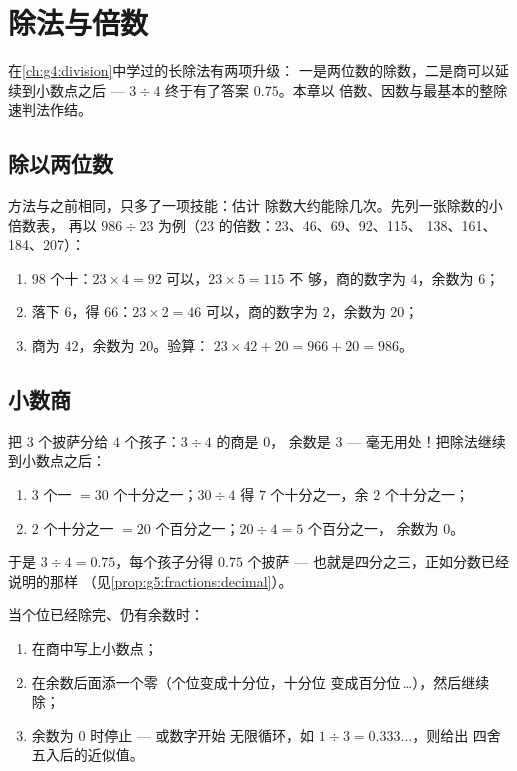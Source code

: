 \chapter{除法与倍数}\label{ch:g5:division}

在\cref{ch:g4:division}中学过的长除法有两项升级：
一是两位数的除数，二是商可以延续到小数点之后 ---
$3 \div 4$ 终于有了答案 $0.75$。本章以
倍数、因数与最基本的整除速判法作结。

\section{除以两位数}

\begin{method}[两位数除数]\label{met:g5:division:twodigits}
方法与之前相同，只多了一项技能：估计
除数大约能除几次。先列一张除数的小倍数表，
再以 $986 \div 23$ 为例（23 的倍数：23、46、69、92、115、
138、161、184、207）：
\begin{enumerate}
  \item $98$ 个十：$23 \times 4 = 92$ 可以，$23 \times 5 = 115$ 不
        够，商的数字为 $4$，余数为 $6$；
  \item 落下 $6$，得 $66$：$23 \times 2 = 46$ 可以，商的数字为
        $2$，余数为 $20$；
  \item 商为 $42$，余数为 $20$。验算：
        $23 \times 42 + 20 = 966 + 20 = 986$。
\end{enumerate}
\end{method}

\section{小数商}

\begin{example}[不肯停在余数处的除法]\label{ex:g5:division:decimal}
把 $3$ 个披萨分给 $4$ 个孩子：$3 \div 4$ 的商是 $0$，
余数是 $3$ --- 毫无用处！把除法继续到小数点之后：
\begin{enumerate}
  \item $3$ 个一 $= 30$ 个十分之一；$30 \div 4$ 得 $7$ 个十分之一，余
        $2$ 个十分之一；
  \item $2$ 个十分之一 $= 20$ 个百分之一；$20 \div 4 = 5$ 个百分之一，
        余数为 $0$。
\end{enumerate}
于是 $3 \div 4 = 0.75$，每个孩子分得 $0.75$ 个披萨 ---
也就是四分之三，正如分数已经说明的那样
（见\cref{prop:g5:fractions:decimal}）。
\end{example}

\begin{method}[把除法延续到小数点之后]\label{met:g5:division:continue}
当个位已经除完、仍有余数时：
\begin{enumerate}
  \item 在商中写上小数点；
  \item 在余数后面添一个零（个位变成十分位，十分位
        变成百分位\,\dots），然后继续除；
  \item 余数为 $0$ 时停止 --- 或数字开始
        无限循环，如 $1 \div 3 = 0.333\dots$，则给出
        四舍五入后的近似值。
\end{enumerate}
\end{method}

